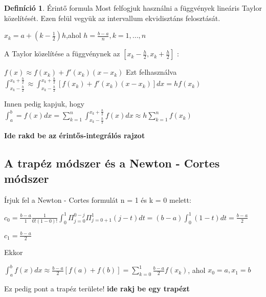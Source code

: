 \documentclass{article}
\theoremstyle{definition}
\newtheorem{definition}{Definíció}
\begin{document}
\begin{definition}
Érintő formula
Most felfogjuk használni a függvények lineáris Taylor közelítését. Ezen felül vegyük az intervallum ekvidisztáns felosztását.
\begin{center}
   $x_k = a + (k - \frac{1}{2})h$,ahol $h = \frac{b-a}{n}, k =1,...,n$ 
\end{center}
A Taylor közelítése a függvénynek az $[x_k-\frac{h}{2},x_k+\frac{h}{2}]$ :
\begin{center}
   $f(x) \approx f(x_k)+f'(x_k)(x-x_k)$ 
   Ezt felhasználva
$\int_{x_k - \frac{h}{2}}^{x_k + \frac{h}{2}} \approx \int_{x_k - \frac{h}{2}}^{x_k + \frac{h}{2}} [f(x_k) + f'(x_k)(x-x_k)] dx = hf(x_k)$

Innen pedig kapjuk, hogy
$\int_a^b = f(x) dx = \sum_{k=1}^n \int_{x_k - \frac{h}{2}}^{x_k + \frac{h}{2}} f(x)dx \approx h \sum_{k=1}^n f(x_k)$
\end{center}

\textbf{Ide rakd be az érintős-integrálós rajzot}
\end{definition}
\subsection{A trapéz módszer és a Newton - Cortes módszer}
Írjuk fel a Newton - Cortes formulát n = 1 és k = 0 melett:
\begin{center}
$c_0 = \frac{b-a}{1} \frac{1}{0!(1-0)!} \int_0^{1} \Pi_{j=0}^{0-j} \Pi_{j=0+1}^{1} (j-t) dt = (b-a) \int_0^1 (1-t) dt = \frac{b-a}{2}$
\end{center}

\begin{center}
$c_1 = \frac{b-a}{2}$
\end{center}
Ekkor 

\begin{center}
    $\int_a^b f(x) dx \approx \frac{b-a}{2}[f(a) + f(b)] = \sum_{k=0}^{1} \frac{b-a}{2} f(x_k)$, ahol $x_0 = a,x_1=b$
\end{center}
Ez pedig pont a trapéz területe!
\newline
\textbf{ide rakj be egy trapézt}
\end{document}
